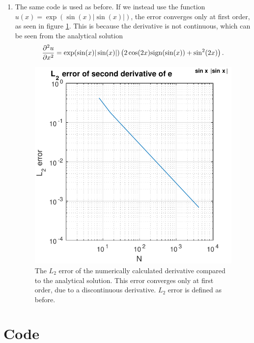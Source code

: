 \documentclass{article}
\begin{document}
\begin{enumerate}
\item
The same code is used as before.
If we instead use the function $u(x) = \exp(\sin(x) |\sin(x)|)$, the error converges only at first order, as seen in figure \ref{fig:p2abs}.
This is because the derivative is not continuous, which can be seen from the analytical solution
\begin{align}
\frac{\partial^{2} u}{ \partial x^{2}} = \exp(\sin(x) |\sin(x)|) \left( 2 \cos(2 x) \mathrm{sign}(\sin(x)) + \sin^2(2 x) \right).
\end{align}
\begin{figure}[!ht]
\centering
\includegraphics[scale=1]{p2errabs.pdf}
\caption{The $L_2$ error of the numerically calculated derivative compared to the analytical solution. This error converges only at first order, due to a discontinuous derivative. $L_2$ error is defined as before.}
\label{fig:p2abs}
\end{figure}
\end{enumerate}

\clearpage
\appendix
\section{Code}




\end{document}
